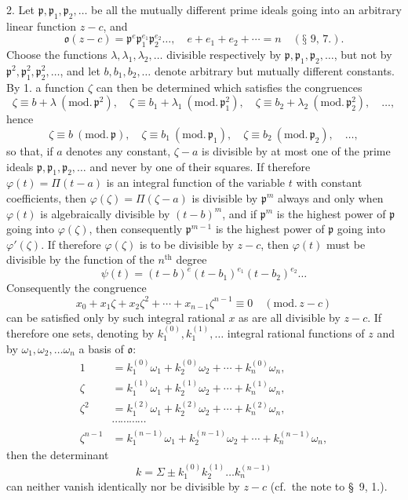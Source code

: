 \documentclass{article}
\begin{document}

2. Let $\mathfrak{p}, \mathfrak{p}_{1}, \mathfrak{p}_{2}, \ldots$ be all the mutually different prime ideals going into an arbitrary linear function $z-c$, and
\[ \mathfrak{o}(z-c) = \mathfrak{p}^{e}\mathfrak{p}_{1}^{e_{1}}\mathfrak{p}_{2}^{e_{2}}\ldots, \quad e + e_{1} + e_{2} + \cdots = n \quad (\text{§~9, 7.}). \]
Choose the functions $\lambda, \lambda_{1}, \lambda_{2}, \ldots$ divisible respectively by $\mathfrak{p}, \mathfrak{p}_{1}, \mathfrak{p}_{2}, \ldots$, but not by $\mathfrak{p}^{2}, \mathfrak{p}_{1}^{2}, \mathfrak{p}_{2}^{2}, \ldots$, and let $b, b_{1}, b_{2}, \ldots$ denote arbitrary but mutually different constants. By 1. a function $\zeta$ can then be determined which satisfies the congruences
\[ \zeta \equiv b + \lambda \ (\text{mod.}\,\mathfrak{p}^{2}), \quad \zeta \equiv b_{1} + \lambda_{1} \ (\text{mod.}\,\mathfrak{p}_{1}^{2}), \quad \zeta \equiv b_{2} + \lambda_{2} \ (\text{mod.}\,\mathfrak{p}_{2}^{2}), \quad \ldots, \]
hence
\[ \zeta \equiv b \ (\text{mod.}\,\mathfrak{p}), \quad \zeta \equiv b_{1} \ (\text{mod.}\,\mathfrak{p}_{1}), \quad \zeta \equiv b_{2} \ (\text{mod.}\,\mathfrak{p}_{2}), \quad \ldots, \]
so that, if $a$ denotes any constant, $\zeta-a$ is divisible by at most one of the prime ideals $\mathfrak{p}, \mathfrak{p}_{1}, \mathfrak{p}_{2}, \ldots$ and never by one of their squares. If therefore $\varphi(t) = \Pi(t-a)$ is an integral function of the variable $t$ with constant coefficients, then $\varphi(\zeta) = \Pi(\zeta-a)$ is divisible by $\mathfrak{p}^{m}$ always and only when $\varphi(t)$ is algebraically divisible by $(t-b)^{m}$, and if $\mathfrak{p}^{m}$ is the highest power of $\mathfrak{p}$ going into $\varphi(\zeta)$, then consequently $\mathfrak{p}^{m-1}$ is the highest power of $\mathfrak{p}$ going into $\varphi'(\zeta)$. If therefore $\varphi(\zeta)$ is to be divisible by $z-c$, then $\varphi(t)$ must be divisible by the function of the $n^{\text{th}}$ degree
\[ \psi(t) = (t-b)^{e}(t-b_{1})^{e_{1}}(t-b_{2})^{e_{2}}\ldots \]
Consequently the congruence
\[ x_{0} + x_{1}\zeta + x_{2}\zeta^{2} + \cdots + x_{n-1}\zeta^{n-1} \equiv 0 \quad (\text{mod.}\,z-c) \]
can be satisfied only by such integral rational $x$ as are all divisible by $z-c$. If therefore one sets, denoting by $k_{1}^{(0)}, k_{1}^{(1)}, \ldots$ integral rational functions of $z$ and by $\omega_{1}, \omega_{2}, \ldots \omega_{n}$ a basis of $\mathfrak{o}$:
\[ \begin{aligned} 1 &= k_{1}^{(0)}\omega_{1} + k_{2}^{(0)}\omega_{2} + \cdots + k_{n}^{(0)}\omega_{n}, \\ \zeta &= k_{1}^{(1)}\omega_{1} + k_{2}^{(1)}\omega_{2} + \cdots + k_{n}^{(1)}\omega_{n}, \\ \zeta^{2} &= k_{1}^{(2)}\omega_{1} + k_{2}^{(2)}\omega_{2} + \cdots + k_{n}^{(2)}\omega_{n}, \\ &\cdots\cdots\cdots\cdots \\ \zeta^{n-1} &= k_{1}^{(n-1)}\omega_{1} + k_{2}^{(n-1)}\omega_{2} + \cdots + k_{n}^{(n-1)}\omega_{n}, \end{aligned} \]
then the determinant
\[ k = \Sigma \pm k_{1}^{(0)}k_{2}^{(1)}\ldots k_{n}^{(n-1)} \]
can neither vanish identically nor be divisible by $z-c$ (cf.\ the note to §~9, 1.).
\end{document}

